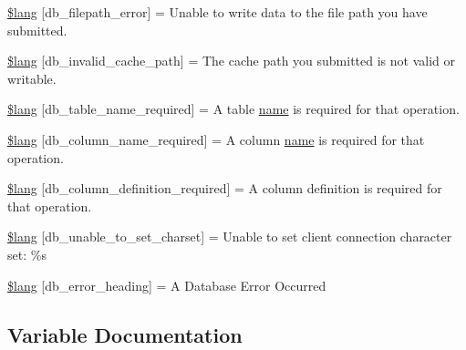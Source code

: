 \begin{DoxyCompactItemize}
\mbox{\hyperlink{db__lang_8php_ab7a05ad84cc1f2f472051d11e1efbcc7}{\$lang}} \mbox{[}\textquotesingle{}db\+\_\+filepath\+\_\+error\textquotesingle{}\mbox{]} = \textquotesingle{}Unable to write data to the file path you have submitted.\textquotesingle{}
\item 
\mbox{\hyperlink{db__lang_8php_acf5030041eda6a044c1bb74164cca4ec}{\$lang}} \mbox{[}\textquotesingle{}db\+\_\+invalid\+\_\+cache\+\_\+path\textquotesingle{}\mbox{]} = \textquotesingle{}The cache path you submitted is not valid or writable.\textquotesingle{}
\item 
\mbox{\hyperlink{db__lang_8php_a76120f724a53ceed19f7bcfe5ed19381}{\$lang}} \mbox{[}\textquotesingle{}db\+\_\+table\+\_\+name\+\_\+required\textquotesingle{}\mbox{]} = \textquotesingle{}A table \mbox{\hyperlink{waiter_2order_8php_afb270cde4944e425a37cf277116a7f43}{name}} is required for that operation.\textquotesingle{}
\item 
\mbox{\hyperlink{db__lang_8php_a583750655109a685fadc9326b2f50d59}{\$lang}} \mbox{[}\textquotesingle{}db\+\_\+column\+\_\+name\+\_\+required\textquotesingle{}\mbox{]} = \textquotesingle{}A column \mbox{\hyperlink{waiter_2order_8php_afb270cde4944e425a37cf277116a7f43}{name}} is required for that operation.\textquotesingle{}
\item 
\mbox{\hyperlink{db__lang_8php_aba66a7f1d6d0e96b1f38df5af45ad905}{\$lang}} \mbox{[}\textquotesingle{}db\+\_\+column\+\_\+definition\+\_\+required\textquotesingle{}\mbox{]} = \textquotesingle{}A column definition is required for that operation.\textquotesingle{}
\item 
\mbox{\hyperlink{db__lang_8php_a0bcbe4b38afeeecc1015d4dab23d2e80}{\$lang}} \mbox{[}\textquotesingle{}db\+\_\+unable\+\_\+to\+\_\+set\+\_\+charset\textquotesingle{}\mbox{]} = \textquotesingle{}Unable to set client connection character set\+: \%s\textquotesingle{}
\item 
\mbox{\hyperlink{db__lang_8php_ac5073170f6cb2a17aeaf0d2e9f7c070a}{\$lang}} \mbox{[}\textquotesingle{}db\+\_\+error\+\_\+heading\textquotesingle{}\mbox{]} = \textquotesingle{}A Database Error Occurred\textquotesingle{}
\end{DoxyCompactItemize}


\subsection{Variable Documentation}
\mbox{\label{db__lang_8php_a76d5998046a2a744fb884f1639d93b79}} 
